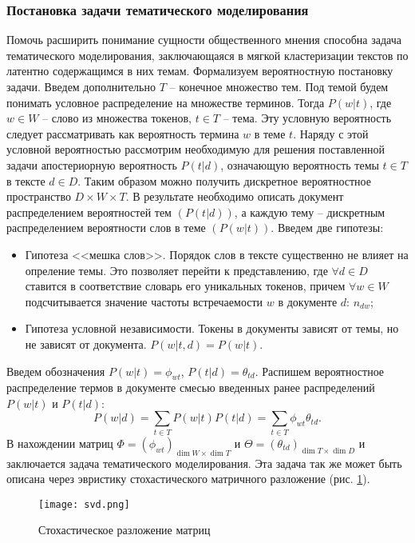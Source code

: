 \subsubsection{Постановка задачи тематического моделирования}
Помочь расширить понимание сущности общественного мнения способна задача тематического моделирования, заключающаяся в мягкой кластеризации текстов по латентно содержащимся в них темам. Формализуем вероятностную постановку задачи. Введем дополнительно $T$ -- конечное множество тем. Под темой будем понимать условное распределение на множестве терминов. Тогда $P(w|t)$, где $w \in W$ -- слово из множества токенов, $t \in T$ -- тема. Эту условную вероятность следует рассматривать как вероятность термина $w$ в теме $t$. Наряду с этой условной вероятностью рассмотрим необходимую для решения поставленной задачи апостериорную вероятность $P(t|d)$, означающую вероятность темы $t\in T$ в тексте $d \in D$. Таким образом можно получить дискретное вероятностное пространство $D \times W \times T$. В результате необходимо описать документ распределением вероятностей тем $(P(t|d))$, а каждую тему -- дискретным распределением вероятности слов в теме $(P(w|t))$. Введем две гипотезы:
\begin{itemize}
    \item Гипотеза <<мешка слов>>. Порядок слов в тексте существенно не влияет на опреление темы. Это позволяет перейти к представлению, где $\forall d \in D$ ставится в соответствие словарь его уникальных токенов, причем $\forall w \in W$ подсчитывается значение частоты встречаемости $w$ в документе $d$: $n_{dw}$;
    \item Гипотеза условной независимости. Токены в документы зависят от темы, но не зависят от документа. $P(w|t,d) = P(w|t)$.
\end{itemize}
Введем обозначения $P(w|t) = \phi_{wt}$, $P(t|d) = \theta_{td}$. Распишем вероятностное распределение термов в документе смесью введенных ранее распределений $P(w|t)$ и $P(t|d)$:
\[P(w|d) = \sum \limits_{t\in T} P(w|t)P(t|d) = \sum\limits_{t\in T} \phi_{wt}\theta_{td}.\]
В нахождении матриц $\Phi = \left(\phi_{wt}\right)_{\dim{W}\times \dim{T}}$ и $\Theta = \left(\theta_{td}\right)_{\dim{T} \times \dim{D}}$ и заключается задача тематического моделирования. Эта задача так же может быть описана через эвристику стохастического матричного разложение (рис. \ref{fig:svd}).
\begin{figure}[H]
    \centering
    \texttt{[image: svd.png]}
    \caption{Стохастическое разложение матриц}
    \label{fig:svd}
\end{figure}